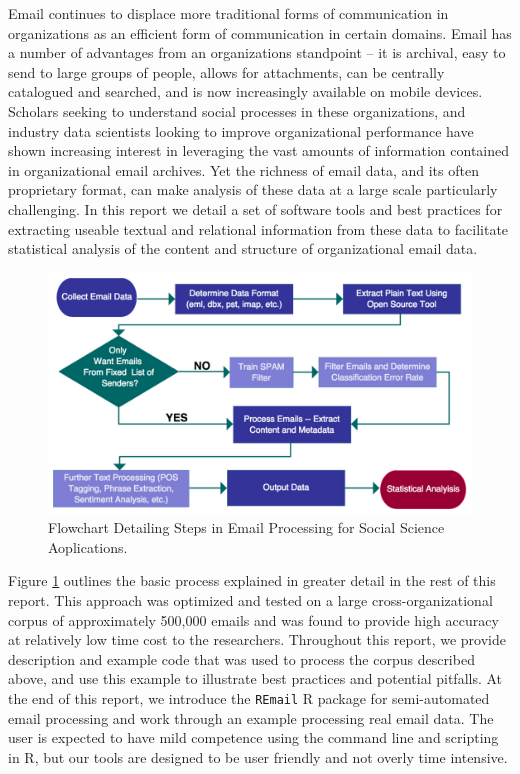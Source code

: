 \documentclass[fleqn]{MJDArticle}
\begin{document}
\large

\noindent Email continues to displace more traditional forms of communication in organizations as an efficient form of communication in certain domains. Email has a number of advantages from an organizations standpoint -- it is archival, easy to send to large groups of people, allows for attachments, can be centrally catalogued and searched, and is now increasingly available on mobile devices. Scholars seeking to understand social processes in these organizations, and industry data scientists looking to improve organizational performance have shown increasing interest in leveraging the vast amounts of information contained in organizational email archives. Yet the richness of email data, and its often proprietary format, can make analysis of these data at a large scale particularly challenging. In this report we detail a set of software tools and best practices for extracting useable textual and relational information from these data to facilitate statistical analysis of the content and structure of organizational email data. 

 
\begin{center}
	\begin{figure}[H]
		\centering
		\caption{\label{fig:email processing flowchart} Flowchart Detailing Steps in Email Processing for Social Science Aoplications.}
		\includegraphics[width = .9\textwidth]{images/Email_Processing.pdf}
	\end{figure}
\end{center}

\noindent Figure \ref{fig:email processing flowchart} outlines the basic process explained in greater detail in the rest of this report. This approach was optimized and tested on a large cross-organizational corpus of approximately 500,000 emails and was found to provide high accuracy at relatively low time cost to the researchers. Throughout this report, we provide description and example code that was used to process the corpus described above, and use this example to illustrate best practices and potential pitfalls. At the end of this report, we introduce the \texttt{REmail} R package for semi-automated email processing and work through an example processing real email data. The user is expected to have mild competence using the command line and scripting in R, but our tools are designed to be user friendly and not overly time intensive.   
\end{document}
